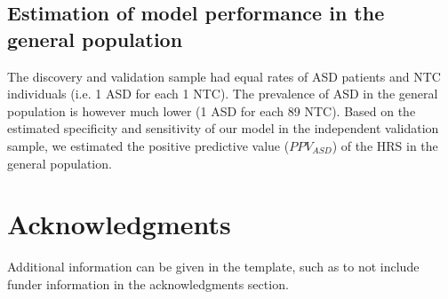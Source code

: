 \documentclass[9pt,lineno]{elife}
\begin{document}
\subsection{Estimation of model performance in the general population}
The discovery and validation sample had equal rates of ASD patients and NTC individuals (i.e. 1 ASD for each 1 NTC). The prevalence of ASD in the general population is however much lower (1 ASD for each 89 NTC). Based on the estimated specificity and sensitivity of our model in the independent validation sample, we estimated the positive predictive value ($PPV_{ASD}$) of the HRS in the general population.

\section{Acknowledgments}

Additional information can be given in the template, such as to not include funder information in the acknowledgments section.



\end{document}
